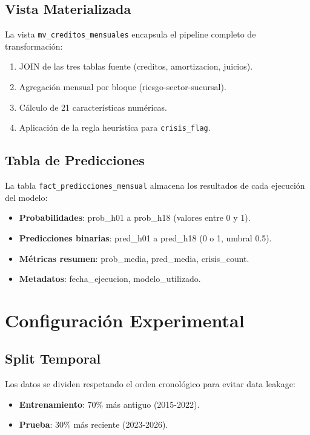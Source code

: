 \subsection{Vista Materializada}

La vista \texttt{mv\_creditos\_mensuales} encapsula el pipeline completo de transformación:

\begin{enumerate}
    \item JOIN de las tres tablas fuente (creditos, amortizacion, juicios).
    \item Agregación mensual por bloque (riesgo-sector-sucursal).
    \item Cálculo de 21 características numéricas.
    \item Aplicación de la regla heurística para \texttt{crisis\_flag}.
\end{enumerate}

\subsection{Tabla de Predicciones}

La tabla \texttt{fact\_predicciones\_mensual} almacena los resultados de cada ejecución del modelo:

\begin{itemize}
    \item \textbf{Probabilidades}: prob\_h01 a prob\_h18 (valores entre 0 y 1).
    \item \textbf{Predicciones binarias}: pred\_h01 a pred\_h18 (0 o 1, umbral 0.5).
    \item \textbf{Métricas resumen}: prob\_media, pred\_media, crisis\_count.
    \item \textbf{Metadatos}: fecha\_ejecucion, modelo\_utilizado.
\end{itemize}

\section{Configuración Experimental}

\subsection{Split Temporal}

Los datos se dividen respetando el orden cronológico para evitar data leakage:

\begin{itemize}
    \item \textbf{Entrenamiento}: 70\% más antiguo (2015-2022).
    \item \textbf{Prueba}: 30\% más reciente (2023-2026).
\end{itemize}

